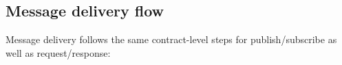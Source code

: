 \subsection{Message delivery flow} \label{subsec:ch3_message_lifecycle}

Message delivery follows the same contract-level steps for publish/subscribe as well as request/response:


